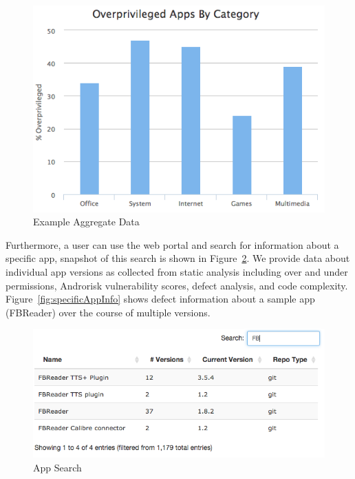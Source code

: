 \documentclass[conference]{IEEEtran}
\begin{document}
\begin{figure}[ht!]
\centering
\includegraphics[width=\columnwidth, angle = 0, scale=.8]{images/Category.png}
\caption{Example Aggregate Data}
\label{fig:aggregateInfo1}
\end{figure}

Furthermore, a user can use the web portal and  search  for information about a specific app, snapshot of this search is shown in Figure~\ref{fig:appsearch}. We provide data about individual app versions as collected from static analysis including over and under permissions, Androrisk vulnerability scores, defect analysis, and code complexity. Figure~\ref{fig:specificAppInfo} shows defect information about a sample app (FBReader) over the course of multiple versions.



\begin{figure}[ht!]
\centering
\includegraphics[width=\columnwidth, angle = 0]{images/FB_app_search.png}
\caption{App Search}
\label{fig:appsearch}
\end{figure}
\end{document}
